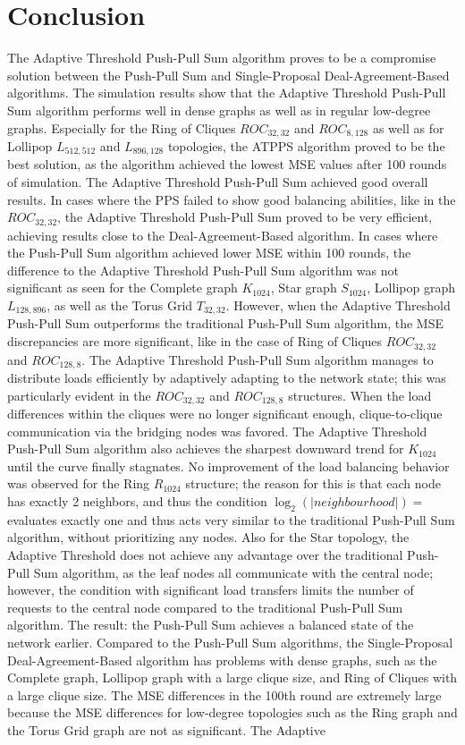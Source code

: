 \chapter{Conclusion}\label{chap:conclusion}
The Adaptive Threshold Push-Pull Sum algorithm proves to be a compromise solution between the Push-Pull Sum and Single-Proposal Deal-Agreement-Based algorithms. The simulation results show that the Adaptive Threshold Push-Pull Sum algorithm performs well in dense graphs as well as in regular low-degree graphs. Especially for the Ring of Cliques $ROC_{32,32}$ and $ROC_{8,128}$ as well as for Lollipop $L_{512,512}$ and $L_{896,128}$ topologies, the ATPPS algorithm proved to be the best solution, as the algorithm achieved the lowest MSE values after 100 rounds of simulation. The Adaptive Threshold Push-Pull Sum achieved good overall results. In cases where the PPS failed to show good balancing abilities, like in the $ROC_{32,32}$, the Adaptive Threshold Push-Pull Sum proved to be very efficient, achieving results close to the Deal-Agreement-Based algorithm. In cases where the Push-Pull Sum algorithm achieved lower MSE within 100 rounds, the difference to the Adaptive Threshold Push-Pull Sum algorithm was not significant as seen for the Complete graph $K_{1024}$, Star graph $S_{1024}$, Lollipop graph $L_{128,896}$, as well as the Torus Grid $T_{32,32}$. However, when the Adaptive Threshold Push-Pull Sum outperforms the traditional Push-Pull Sum algorithm, the MSE discrepancies are more significant, like in the case of Ring of Cliques $ROC_{32,32}$ and $ROC_{128,8}$. The Adaptive Threshold Push-Pull Sum algorithm manages to distribute loads efficiently by adaptively adapting to the network state; this was particularly evident in the $ROC_{32,32}$ and $ROC_{128,8}$ structures. When the load differences within the cliques were no longer significant enough, clique-to-clique communication via the bridging nodes was favored. The Adaptive Threshold Push-Pull Sum algorithm also achieves the sharpest downward trend for $K_{1024}$ until the curve finally stagnates. No improvement of the load balancing behavior was observed for the Ring $R_{1024}$ structure; the reason for this is that each node has exactly 2 neighbors, and thus the condition $\log_{2}{(|neighbourhood|)}=$ evaluates exactly one and thus acts very similar to the traditional Push-Pull Sum algorithm, without prioritizing any nodes. Also for the Star topology, the Adaptive Threshold does not achieve any advantage over the traditional Push-Pull Sum algorithm, as the leaf nodes all communicate with the central node; however, the condition with significant load transfers limits the number of requests to the central node compared to the traditional Push-Pull Sum algorithm. The result: the Push-Pull Sum achieves a balanced state of the network earlier. Compared to the Push-Pull Sum algorithms, the Single-Proposal Deal-Agreement-Based algorithm has problems with dense graphs, such as the Complete graph, Lollipop graph with a large clique size, and Ring of Cliques with a large clique size. The MSE differences in the 100th round are extremely large because the MSE differences for low-degree topologies such as the Ring graph and the Torus Grid graph are not as significant. The Adaptive 
